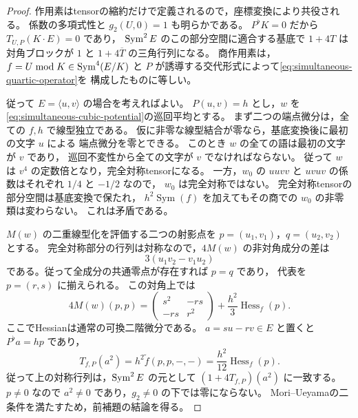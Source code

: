 \begin{proof}
作用素はtensorの縮約だけで定義されるので，座標変換により共役される。
係数の多項式性と $g_2(U,0)=1$ も明らかである。
$P^\flat K=0$ だから $T_{U,P}(K\cdot E)=0$ であり，
$\operatorname{Sym}^2E$ のこの部分空間に適合する基底で $1+4T$ は
対角ブロックが $1$ と $1+4\overline T$ の三角行列になる。
商作用素は，$f=U\bmod K\in\operatorname{Sym}^4(E/K)$ と
$P$ が誘導する交代形式によって\eqref{eq:simultaneous-quartic-operator}を
構成したものに等しい。

従って $E=\langle u,v\rangle$ の場合を考えればよい。
$P(u,v)=h$ とし，$w$ を\eqref{eq:simultaneous-cubic-potential}の巡回平均とする。
まず二つの端点微分は，全ての $f,h$ で線型独立である。
仮に非零な線型結合が零なら，基底変換後に最初の文字 $u$ による
端点微分を零とできる。
このとき $w$ の全ての語は最初の文字が $v$ であり，
巡回不変性から全ての文字が $v$ でなければならない。
従って $w$ は $v^4$ の定数倍となり，完全対称tensorになる。
一方，$w_0$ の $uuvv$ と $uvuv$ の係数はそれぞれ $1/4$ と $-1/2$ なので，
$w_0$ は完全対称ではない。
完全対称tensorの部分空間は基底変換で保たれ，
$h^2\operatorname{Sym}(f)$ を加えてもその商での $w_0$ の非零類は変わらない。
これは矛盾である。

$M(w)$ の二重線型化を評価する二つの射影点を
$p=(u_1,v_1)$，$q=(u_2,v_2)$ とする。
完全対称部分の行列は対称なので，$4M(w)$ の非対角成分の差は
\[
 3(u_1v_2-v_1u_2)
\]
である。従って全成分の共通零点が存在すれば $p=q$ であり，
代表を $p=(r,s)$ に揃えられる。
この対角上では
\[
 4M(w)(p,p)=
 \begin{pmatrix}s^2&-rs\\-rs&r^2\end{pmatrix}
       +\frac{h^2}{3}\operatorname{Hess}_f(p).
\]
ここでHessianは通常の可換二階微分である。
$a=su-rv\in E$ と置くと $P^\flat a=hp$ であり，
\[
 T_{f,P}(a^2)=h^2\widetilde f(p,p,-,-)
             =\frac{h^2}{12}\operatorname{Hess}_f(p).
\]
従って上の対称行列は，$\operatorname{Sym}^2E$ の元として
$(1+4T_{f,P})(a^2)$ に一致する。
$p\ne0$ なので $a^2\ne0$ であり，$g_2\ne0$ の下では零にならない。
Mori--Ueyamaの二条件を満たすため，前補題の結論を得る。
\end{proof}


